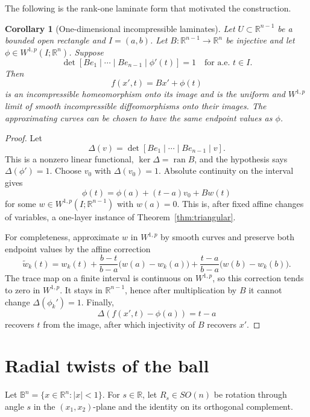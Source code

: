 \documentclass[11pt]{article}
\newtheorem{corollary}[theorem]{Corollary}
\theoremstyle{remark}
\newcommand{\R}{\mathbb{R}}
\newcommand{\B}{\mathbb{B}}
\begin{document}
The following is the rank-one laminate form that motivated the construction.

\begin{corollary}[One-dimensional incompressible laminates]
\label{cor:laminate}
Let $U\subset\R^{n-1}$ be a bounded open rectangle and $I=(a,b)$.  Let
$B:\R^{n-1}\to\R^n$ be injective and let
$\phi\in W^{1,p}(I;\R^n)$.  Suppose
\[
 \det[Be_1\mid\cdots\mid Be_{n-1}\mid\phi'(t)]=1
 \quad\text{for a.e. }t\in I.
\]
Then
\[
 f(x',t)=Bx'+\phi(t)
\]
is an incompressible homeomorphism onto its image and is the uniform and
$W^{1,p}$ limit of smooth incompressible diffeomorphisms onto their images.
The approximating curves can be chosen to have the same endpoint values as
$\phi$.
\end{corollary}

\begin{proof}
Let
\[
 \Delta(v)=\det[Be_1\mid\cdots\mid Be_{n-1}\mid v].
\]
This is a nonzero linear functional, $\ker\Delta=\operatorname{ran}B$, and
the hypothesis says $\Delta(\phi')=1$.  Choose $v_0$ with
$\Delta(v_0)=1$.  Absolute continuity on the interval gives
\[
 \phi(t)=\phi(a)+(t-a)v_0+B w(t)
\]
for some $w\in W^{1,p}(I;\R^{n-1})$ with $w(a)=0$.  This is, after fixed
affine changes of variables, a one-layer instance of
Theorem~\ref{thm:triangular}.

For completeness, approximate $w$ in $W^{1,p}$ by smooth curves and preserve
both endpoint values by the affine correction
\[
 \widetilde w_k(t)=w_k(t)
 +\frac{b-t}{b-a}\bigl(w(a)-w_k(a)\bigr)
 +\frac{t-a}{b-a}\bigl(w(b)-w_k(b)\bigr).
\]
The trace map on a finite interval is continuous on $W^{1,p}$, so this
correction tends to zero in $W^{1,p}$.  It stays in $\R^{n-1}$, hence after
multiplication by $B$ it cannot change $\Delta(\phi_k')=1$.  Finally,
\[
 \Delta(f(x',t)-\phi(a))=t-a
\]
recovers $t$ from the image, after which injectivity of $B$ recovers $x'$.
\end{proof}

\section{Radial twists of the ball}

Let $\B^n=\{x\in\R^n:|x|<1\}$.  For $s\in\R$, let $R_s\in SO(n)$ be
rotation through angle $s$ in the $(x_1,x_2)$-plane and the identity on its
orthogonal complement.
\end{document}
